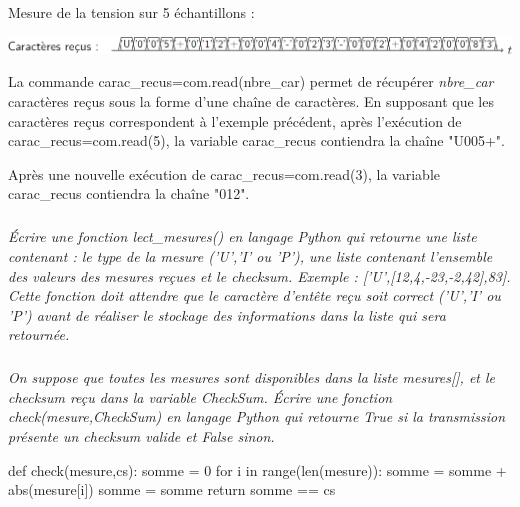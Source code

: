 \documentclass[10pt]{article}
\newif\ifprof
\begin{document}
\begin{exemple}
Mesure de la tension sur 5 échantillons :
\begin{center}
\includegraphics[width=.75\textwidth]{images/fig_02}
\end{center}
\end{exemple}

La commande \textsf{carac\_recus=com.read(nbre\_car)} permet de récupérer \textit{nbre\_car} caractères 
reçus sous la forme d'une chaîne de caractères. En supposant que les caractères reçus correspondent à l'exemple précédent, après l'exécution de  \textsf{carac\_recus=com.read(5)}, la variable
\textsf{carac\_recus} contiendra la chaîne "U005+".

Après une nouvelle exécution de \textsf{carac\_recus=com.read(3)}, la variable \textsf{carac\_recus} contiendra la chaîne "012".


\subparagraph{}
\textit{Écrire une fonction \textsf{lect\_mesures()} en langage Python qui retourne une liste contenant :
le type de la mesure ('U','I' ou 'P'), une liste contenant l'ensemble des valeurs des mesures
reçues et le checksum. Exemple : ['U',[12,4,-23,-2,42],83]. Cette fonction doit attendre que le
caractère d'entête reçu soit correct ('U','I' ou 'P') avant de réaliser le stockage des informations
dans la liste qui sera retournée.}

\ifprof
\begin{corrige}
Remarque : question qui manque de clarté : qu'attend-on en paramètre de la fonction ?
\begin{python}
def lect_mesures():
    while True : 
        carac_recu = com.read(1)
        if  carc_recu=="U" or carc_recu=="I" or carc_recu=="P":
            break
    mesures=[]
    mesures.append(carac_recu)
    # On recherche le nombre de données 
    nb_donnees=int(com.read(3))
    data = []
    for i in range(nb_donnnes):
        # Ajout des données
        data.append(int(com.read(4)))
    mesures.append(data)
    # Ajout de la checksum
    mesures.append(int(com.read(4)))
    return mesures
\end{python}
\end{corrige}

\else
\fi


\subparagraph{}
\textit{On suppose que toutes les mesures sont disponibles dans la liste mesures[], et le checksum reçu dans la variable \textsf{CheckSum}. Écrire une fonction \textsf{check(mesure,CheckSum)} en langage
Python qui retourne \textsf{True} si la transmission présente un checksum valide et \textsf{False} sinon.}
\ifprof
\begin{corrige}
\begin{python}
def check(mesure,cs):
    somme = 0
    for i in range(len(mesure)):
        somme = somme + abs(mesure[i])
    somme = somme %
    return somme == cs
\end{python}

\end{corrige}
\end{document}

